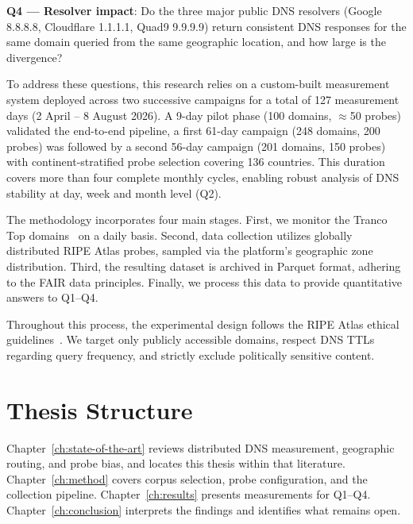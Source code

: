 \textbf{Q4 — Resolver impact}: Do the three major public \ac{DNS} resolvers (Google 8.8.8.8, Cloudflare 1.1.1.1, Quad9 9.9.9.9) return consistent \ac{DNS} responses for the same domain queried from the same geographic location, and how large is the divergence?

To address these questions, this research relies on a custom-built measurement system deployed across two successive campaigns for a total of 127 measurement days (2 April -- 8 August 2026). A 9-day pilot phase (100 domains, $\approx$50 probes) validated the end-to-end pipeline, a first 61-day campaign (248 domains, 200 probes) was followed by a second 56-day campaign (201 domains, 150 probes) with continent-stratified probe selection covering 136 countries. This duration covers more than four complete monthly cycles, enabling robust analysis of \ac{DNS} stability at day, week and month level (Q2). 

The methodology incorporates four main stages. First, we monitor the Tranco Top domains~\cite{LePochat2019} on a daily basis. Second, data collection utilizes globally distributed RIPE Atlas probes, sampled via the platform's geographic zone distribution. Third, the resulting dataset is archived in Parquet format, adhering to the \ac{FAIR} data principles. Finally, we process this data to provide quantitative answers to Q1–Q4.

Throughout this process, the experimental design follows the RIPE Atlas ethical guidelines~\cite{Kisteleki2016}. We target only publicly accessible domains, respect \ac{DNS} \ac{TTL}s regarding query frequency, and strictly exclude politically sensitive content.

\bigskip
\section{Thesis Structure}
\label{sec:1.4}

Chapter~\ref{ch:state-of-the-art} reviews distributed \ac{DNS} measurement, geographic routing, and probe bias, and locates this thesis within that literature. Chapter~\ref{ch:method} covers corpus selection, probe configuration, and the collection pipeline. Chapter~\ref{ch:results} presents measurements for Q1--Q4. Chapter~\ref{ch:conclusion} interprets the findings and identifies what remains open.